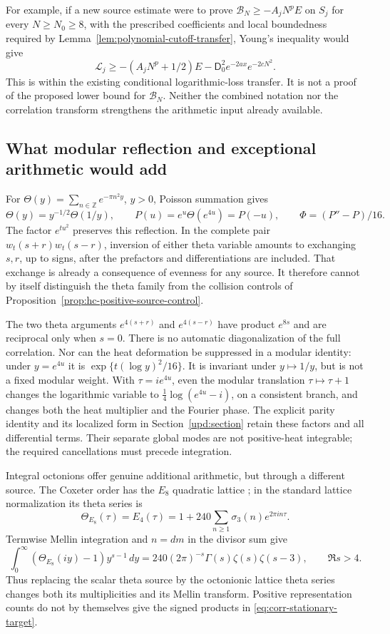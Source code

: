 \documentclass[11pt]{article}
\numberwithin{equation}{section}
\theoremstyle{definition}
\theoremstyle{remark}
\newcommand{\dd}{\,d}
\newcommand{\Lag}{\mathcal L}
\begin{document}
For example, if a new source estimate were to prove
\(\mathcal B_N\ge-A_jN^pE\) on \(S_j\) for every \(N\ge N_0\ge8\),
with the prescribed coefficients and local boundedness required by
Lemma~\ref{lem:polynomial-cutoff-transfer}, Young's inequality would
give
\[
 \Lag_j\ge-(A_jN^p+1/2)E
       -\mathsf D_0^2e^{-2ax}e^{-2cN^2}.
\]
This is within the existing conditional logarithmic-loss transfer.
It is not a proof of the proposed lower bound for \(\mathcal B_N\).
Neither the combined notation nor the correlation transform strengthens
the arithmetic input already available.

\subsection{What modular reflection and exceptional arithmetic would add}

For \(\Theta(y)=\sum_{n\in\mathbb Z}e^{-\pi n^2y}\), \(y>0\),
Poisson summation gives
\[
 \Theta(y)=y^{-1/2}\Theta(1/y),\qquad
 P(u)=e^u\Theta(e^{4u})=P(-u),\qquad
 \Phi=(P''-P)/16.
\]
The factor \(e^{tu^2}\) preserves this reflection.
In the complete pair \(w_t(s+r)w_t(s-r)\), inversion of either
theta variable amounts to exchanging \(s,r\), up to signs, after
the prefactors and differentiations are included.  That exchange is
already a consequence of evenness for any source.  It therefore
cannot by itself distinguish the theta family from the collision
controls of Proposition~\ref{prop:hc-positive-source-control}.

The two theta arguments \(e^{4(s+r)}\) and \(e^{4(s-r)}\) have
product \(e^{8s}\) and are reciprocal only when \(s=0\).
There is no automatic diagonalization of the full correlation.
Nor can the heat deformation be suppressed in a modular identity:
under \(y=e^{4u}\) it is
\(\exp\{t(\log y)^2/16\}\).
It is invariant under \(y\mapsto1/y\), but is not a fixed modular
weight.  With \(\tau=ie^{4u}\), even the modular translation
\(\tau\mapsto\tau+1\) changes the logarithmic variable to
\(\frac14\log(e^{4u}-i)\), on a consistent branch, and changes both
the heat multiplier and the Fourier phase.  The explicit parity identity and its localized form in
Section~\ref{upd:section} retain these factors and all differential
terms. Their separate global modes are not positive-heat integrable;
the required cancellations must precede integration.

Integral octonions offer genuine additional arithmetic, but through
a different source.  The Coxeter order has the \(E_8\) quadratic
lattice \cite[Section~1]{elkiesgross}; in the standard lattice
normalization its theta series is
\[
 \Theta_{E_8}(\tau)=E_4(\tau)
     =1+240\sum_{n\ge1}\sigma_3(n)e^{2\pi in\tau}.
\]
Termwise Mellin integration and \(n=dm\) in the divisor sum give
\begin{equation}
 \int_0^\infty(\Theta_{E_8}(iy)-1)y^{s-1}\dd y
  =240(2\pi)^{-s}\Gamma(s)\zeta(s)\zeta(s-3),
          \qquad\Re s>4.
 \label{eq:corr-E8-mellin}
\end{equation}
Thus replacing the scalar theta source by the octonionic lattice
theta series changes both its multiplicities and its Mellin
transform.  Positive representation counts do not by themselves
give the signed products in \eqref{eq:corr-stationary-target}.
\end{document}
